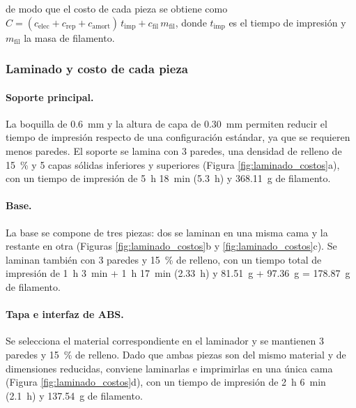 \documentclass[12pt, a4paper]{article}
\begin{document}
de modo que el costo de cada pieza se obtiene como $C = (c_{\text{elec}} + c_{\text{rep}} + c_{\text{amort}})\, t_{\text{imp}} + c_{\text{fil}}\, m_{\text{fil}}$, donde $t_{\text{imp}}$ es el tiempo de impresión y $m_{\text{fil}}$ la masa de filamento.

\subsubsection{Laminado y costo de cada pieza}

\paragraph{Soporte principal.} La boquilla de \SI{0,6}{\mm} y la altura de capa de \SI{0,30}{\mm} permiten reducir el tiempo de impresión respecto de una configuración estándar, ya que se requieren menos paredes. El soporte se lamina con 3 paredes, una densidad de relleno de \SI{15}{\percent} y 5 capas sólidas inferiores y superiores (Figura \ref{fig:laminado_costos}a), con un tiempo de impresión de 5~h 18~min (\SI{5,3}{\hour}) y \SI{368,11}{\gram} de filamento.

\paragraph{Base.} La base se compone de tres piezas: dos se laminan en una misma cama y la restante en otra (Figuras \ref{fig:laminado_costos}b y \ref{fig:laminado_costos}c). Se laminan también con 3 paredes y \SI{15}{\percent} de relleno, con un tiempo total de impresión de 1~h 3~min + 1~h 17~min (\SI{2,33}{\hour}) y \SI{81,51}{\gram} + \SI{97,36}{\gram} = \SI{178,87}{\gram} de filamento.

\paragraph{Tapa e interfaz de ABS.} Se selecciona el material correspondiente en el laminador y se mantienen 3 paredes y \SI{15}{\percent} de relleno. Dado que ambas piezas son del mismo material y de dimensiones reducidas, conviene laminarlas e imprimirlas en una única cama (Figura \ref{fig:laminado_costos}d), con un tiempo de impresión de 2~h 6~min (\SI{2,1}{\hour}) y \SI{137,54}{\gram} de filamento.
\end{document}
